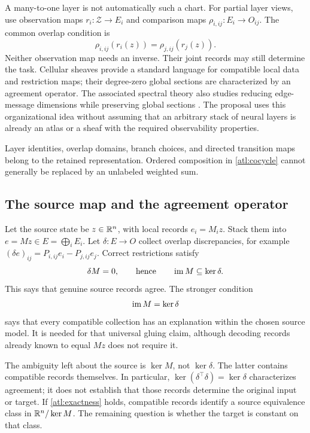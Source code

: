 A many-to-one layer is not automatically such a chart. For partial layer views,
use observation maps $r_i:\mathcal Z\to E_i$ and comparison maps
$\rho_{i,ij}:E_i\to O_{ij}$. The common overlap condition is
\begin{equation}
  \rho_{i,ij}(r_i(z))=\rho_{j,ij}(r_j(z)).
  \label{atl:restriction}
\end{equation}
Neither observation map needs an inverse. Their joint records may still
determine the task. Cellular sheaves provide a standard language for compatible
local data and restriction maps; their degree-zero global sections are
characterized by an agreement operator. The associated spectral theory also
studies reducing edge-message dimensions while preserving global sections
\citep{sheaves}. The proposal uses this organizational idea without assuming
that an arbitrary stack of neural layers is already an atlas or a sheaf with
the required observability properties.

Layer identities, overlap domains, branch choices, and directed transition
maps belong to the retained representation. Ordered composition in
\eqref{atl:cocycle} cannot generally be replaced by an unlabeled weighted sum.

\subsection{The source map and the agreement operator}
\label{atl:two-operators}

Let the source state be $z\in\mathbb R^n$, with local records $e_i=M_i z$.
Stack them into $e=Mz\in E=\bigoplus_i E_i$. Let
$\delta:E\to O$ collect overlap discrepancies, for example
$(\delta e)_{ij}=P_{i,ij}e_i-P_{j,ij}e_j$. Correct restrictions satisfy
\begin{equation}
  \delta M=0,
  \qquad\text{hence}\qquad
  \operatorname{im} M\subseteq\ker\delta.
  \label{atl:complex}
\end{equation}
This says that genuine source records agree. The stronger condition
\begin{equation}
  \operatorname{im} M=\ker\delta
  \label{atl:exactness}
\end{equation}
says that every compatible collection has an explanation within the chosen
source model. It is needed for that universal gluing claim, although decoding
records already known to equal $Mz$ does not require it.

The ambiguity left about the source is $\ker M$, not $\ker\delta$.
The latter contains compatible records themselves. In particular,
$\ker(\delta^\top\delta)=\ker\delta$ characterizes agreement; it does not
establish that those records determine the original input or target. If
\eqref{atl:exactness} holds, compatible records identify a source equivalence
class in $\mathbb R^n/\ker M$. The remaining question is whether the target is
constant on that class.

